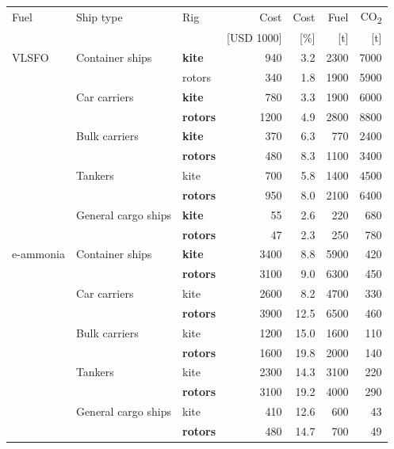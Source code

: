 \begin{tabular}{@{}lllrrrr@{}}
\toprule
Fuel & Ship type & Rig & Cost & Cost & Fuel & CO\textsubscript{2} \\
 &  &  & [USD 1000] & [\%] & [t] & [t] \\
\midrule
VLSFO & Container ships & \textbf{kite} & \num{940} & 3.2 & \num{2300} & \num{7000} \\
 &  & rotors & \num{340} & 1.8 & \num{1900} & \num{5900} \\
\addlinespace
 & Car carriers & \textbf{kite} & \num{780} & 3.3 & \num{1900} & \num{6000} \\
 &  & \textbf{rotors} & \num{1200} & 4.9 & \num{2800} & \num{8800} \\
\addlinespace
 & Bulk carriers & \textbf{kite} & \num{370} & 6.3 & \num{770} & \num{2400} \\
 &  & \textbf{rotors} & \num{480} & 8.3 & \num{1100} & \num{3400} \\
\addlinespace
 & Tankers & kite & \num{700} & 5.8 & \num{1400} & \num{4500} \\
 &  & \textbf{rotors} & \num{950} & 8.0 & \num{2100} & \num{6400} \\
\addlinespace
 & General cargo ships & \textbf{kite} & \num{55} & 2.6 & \num{220} & \num{680} \\
 &  & \textbf{rotors} & \num{47} & 2.3 & \num{250} & \num{780} \\
\midrule
e-ammonia & Container ships & \textbf{kite} & \num{3400} & 8.8 & \num{5900} & \num{420} \\
 &  & \textbf{rotors} & \num{3100} & 9.0 & \num{6300} & \num{450} \\
\addlinespace
 & Car carriers & kite & \num{2600} & 8.2 & \num{4700} & \num{330} \\
 &  & \textbf{rotors} & \num{3900} & 12.5 & \num{6500} & \num{460} \\
\addlinespace
 & Bulk carriers & kite & \num{1200} & 15.0 & \num{1600} & \num{110} \\
 &  & \textbf{rotors} & \num{1600} & 19.8 & \num{2000} & \num{140} \\
\addlinespace
 & Tankers & kite & \num{2300} & 14.3 & \num{3100} & \num{220} \\
 &  & \textbf{rotors} & \num{3100} & 19.2 & \num{4000} & \num{290} \\
\addlinespace
 & General cargo ships & kite & \num{410} & 12.6 & \num{600} & \num{43} \\
 &  & \textbf{rotors} & \num{480} & 14.7 & \num{700} & \num{49} \\
\bottomrule
\end{tabular}

